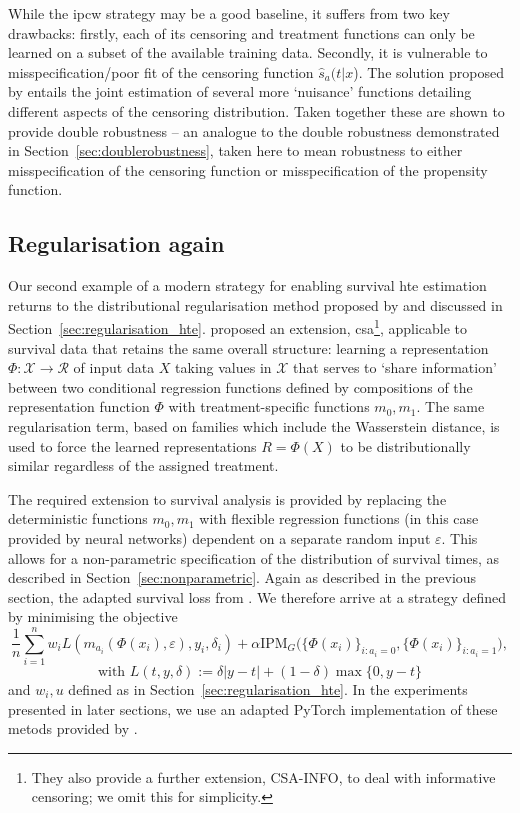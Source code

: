 \documentclass[../thesis.tex]{subfiles}
\begin{document}
While the \gls{ipcw} strategy may be a good baseline, it suffers from two key drawbacks: firstly, each of its censoring and treatment functions can only be learned on a subset of the available training data. Secondly, it is vulnerable to misspecification/poor fit of the censoring function $\hat{s}_a(t|x$). The solution proposed by \citet{cui_estimating_2022} entails the joint estimation of several more `nuisance' functions detailing different aspects of the censoring distribution. Taken together these are shown to provide double robustness -- an analogue to the double robustness demonstrated in Section~\ref{sec:doublerobustness}, taken here to mean robustness to either misspecification of the censoring function or misspecification of the propensity function.


\subsection{Regularisation again \label{sec:surv_reg}}
Our second example of a modern strategy for enabling survival \gls{hte} estimation returns to the distributional regularisation method proposed by \citet{shalit_estimating_2017} and discussed in Section~\ref{sec:regularisation_hte}. \citet{chapfuwa_enabling_2021} proposed an extension, \gls{csa}\footnote{They also provide a further extension, CSA-INFO, to deal with informative censoring; we omit this for simplicity.}, applicable to survival data that retains the same overall structure: learning a representation $\Phi \colon \mathcal{X} \rightarrow \mathcal{R}$ of input data $X$ taking values in $\mathcal{X}$ that serves to `share information' between two conditional regression functions defined by compositions of the representation function $\Phi$ with treatment-specific functions $m_0,m_1$. The same regularisation term, based on  families which include the Wasserstein distance, is used to force the learned representations $R=\Phi(X)$ to be distributionally similar regardless of the assigned treatment. 

The required extension to survival analysis is provided by replacing the deterministic functions $m_0, m_1$ with flexible regression functions (in this case provided by neural networks) dependent on a separate random input $\varepsilon$. This allows for a non-parametric specification of the distribution of survival times, as described in Section~\ref{sec:nonparametric}. Again as described in the previous section, the adapted survival loss from \citet{chapfuwa_adversarial_2018}. We therefore arrive at a strategy defined by minimising the objective 
\[\frac{1}{n}\sum_{i=1}^n w_i L(m_{a_i}(\Phi(x_i), \varepsilon), y_i, \delta_i) + \alpha \mathrm{IPM}_G\big(\{\Phi(x_i)\}_{i:a_i=0}, \{\Phi(x_i)\}_{i:a_i=1}\big),\]
\[\text{with } L(t, y, \delta) := \delta|y-t| + (1-\delta)\max\{0, y-t\} \]
and $w_i, u$ defined as in Section~\ref{sec:regularisation_hte}. In the experiments presented in later sections, we use an adapted PyTorch \citep{paszke_pytorch_2019} implementation of these metods provided by \citep{chapfuwa_enabling_2021}.
\end{document}
